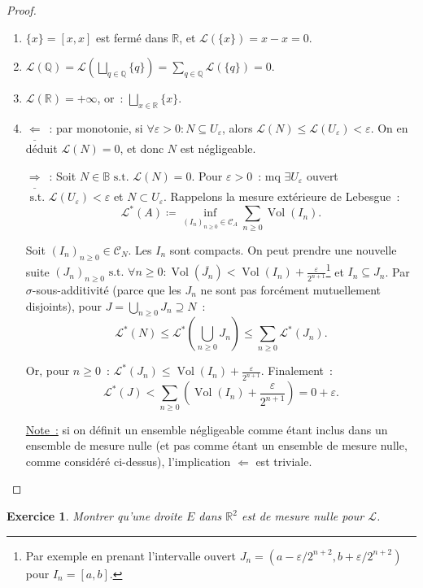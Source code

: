 \documentclass{article}
\newtheorem{ex}{Exercice}[section]
\theoremstyle{definition}
\newcommand{\pinfty}{{+\infty}}
\newcommand{\st}{\text{ s.t. }}
\newcommand{\Q}{{\mathbb Q}}
\newcommand{\R}{{\mathbb R}}
\newcommand{\B}{{\mathbb B}}
\DeclareMathOperator{\Vol}{Vol}
\begin{document}
\begin{proof}~
\begin{enumerate}
	\item $\{x\} = [x, x]$ est fermé dans $\R$, et $\mathcal L(\{x\}) = x-x = 0$.
	\item $\mathcal L(\Q) = \mathcal L(\bigsqcup_{q \in \Q}\{q\}) = \sum_{q \in \Q}\mathcal L(\{q\}) = 0$.
	\item $\mathcal L(\R) = \pinfty$, or~: $\bigsqcup_{x \in \R}\{x\}$.
	\item $\underline {\Leftarrow}$~: par monotonie, si $\forall \varepsilon > 0 : N \subseteq U_\varepsilon$, alors $\mathcal L(N) \leq \mathcal L(U_\varepsilon) < \varepsilon$.
	On en déduit $\mathcal L(N) = 0$, et donc $N$ est négligeable.

	$\underline {\Rightarrow}$~: Soit $N \in \B \st \mathcal L(N) = 0$. Pour $\varepsilon > 0$~: mq $\exists U_\varepsilon$ ouvert $\st \mathcal L(U_\varepsilon) < \varepsilon$
	et $N \subset U_\varepsilon$. Rappelons la mesure extérieure de Lebesgue~:
	\[\mathcal L^*(A) \coloneqq \inf_{(I_n)_{n \geq 0} \in \mathcal C_A}\sum_{n \geq 0}\Vol(I_n).\]

	Soit $(I_n)_{n \geq 0} \in \mathcal C_N$. Les $I_n$ sont compacts. On peut prendre une nouvelle suite $(J_n)_{n \geq 0} \st \forall n \geq 0 :
	\Vol(\overline {J_n}) < \Vol(I_n) + \frac \varepsilon{2^{n+1}}$\footnote{Par exemple en prenant l'intervalle ouvert $J_n = (a-\varepsilon/2^{n+2}, b+\varepsilon/2^{n+2})$
	pour $I_n = [a, b]$.} et $I_n \subseteq J_n$. Par $\sigma$-sous-additivité (parce que les $J_n$ ne sont pas forcément mutuellement disjoints),
	pour $J = \bigcup_{n \geq 0}J_n \supseteq N$~:
	\[\mathcal L^*(N) \leq \mathcal L^*(\bigcup_{n \geq 0}J_n) \leq \sum_{n \geq 0}\mathcal L^*(J_n).\]

	Or, pour $n \geq 0$~: $\mathcal L^*(J_n) \leq \Vol(I_n) + \frac \varepsilon{2^{n+1}}$. Finalement~:
	\[\mathcal L^*(J) < \sum_{n \geq 0}\left(\Vol(I_n) + \frac \varepsilon{2^{n+1}}\right) = 0 + \varepsilon.\]

	\underline {Note~:} si on définit un ensemble négligeable comme étant inclus dans un ensemble de mesure nulle (et pas comme étant un ensemble de mesure nulle, comme considéré
	ci-dessus), l'implication $\Leftarrow$ est triviale.
\end{enumerate}
\end{proof}

\begin{ex} Montrer qu'une droite $E$ dans $\R^2$ est de mesure nulle pour $\mathcal L$.
\end{ex}
\end{document}
